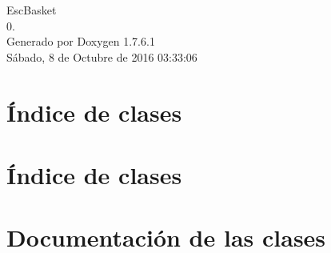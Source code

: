 \documentclass[a4paper]{book}
\begin{document}
\hypersetup{pageanchor=false,citecolor=blue}
\begin{titlepage}
\vspace*{7cm}
\begin{center}
{\Large \-Esc\-Basket \\[1ex]\large 0. }\\
\vspace*{1cm}
{\large \-Generado por Doxygen 1.7.6.1}\\
\vspace*{0.5cm}
{\small Sábado, 8 de Octubre de 2016 03:33:06}\\
\end{center}
\end{titlepage}
\clearemptydoublepage
{}
\tableofcontents
\clearemptydoublepage
{}
\hypersetup{pageanchor=true,citecolor=blue}
\chapter{Índice de clases}

\chapter{Índice de clases}

\chapter{\-Documentación de las clases}


























\printindex
\end{document}
